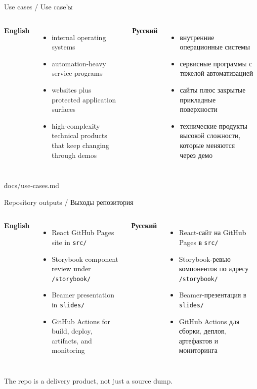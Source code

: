 \documentclass[aspectratio=169]{beamer}
\newcommand{\BilingualFrame}[4]{
  \begin{frame}{#1}
    \small
    \begin{columns}[T,onlytextwidth]
      \column{0.48\textwidth}
      \textbf{English}
      #2
      \column{0.48\textwidth}
      \textbf{Русский}
      #3
    \end{columns}
    \vfill
    {\tiny #4}
  \end{frame}
}
\begin{document}
\BilingualFrame
  {Use cases / Use case'ы}
  {
    \begin{itemize}
      \item internal operating systems
      \item automation-heavy service programs
      \item websites plus protected application surfaces
      \item high-complexity technical products that keep changing through demos
    \end{itemize}
  }
  {
    \begin{itemize}
      \item внутренние операционные системы
      \item сервисные программы с тяжелой автоматизацией
      \item сайты плюс закрытые прикладные поверхности
      \item технические продукты высокой сложности, которые меняются через демо
    \end{itemize}
  }
  {docs/use-cases.md}

\BilingualFrame
  {Repository outputs / Выходы репозитория}
  {
    \begin{itemize}
      \item React GitHub Pages site in \texttt{src/}
      \item Storybook component review under \texttt{/storybook/}
      \item Beamer presentation in \texttt{slides/}
      \item GitHub Actions for build, deploy, artifacts, and monitoring
    \end{itemize}
  }
  {
    \begin{itemize}
      \item React-сайт на GitHub Pages в \texttt{src/}
      \item Storybook-ревью компонентов по адресу \texttt{/storybook/}
      \item Beamer-презентация в \texttt{slides/}
      \item GitHub Actions для сборки, деплоя, артефактов и мониторинга
    \end{itemize}
  }
  {The repo is a delivery product, not just a source dump.}
\end{document}
